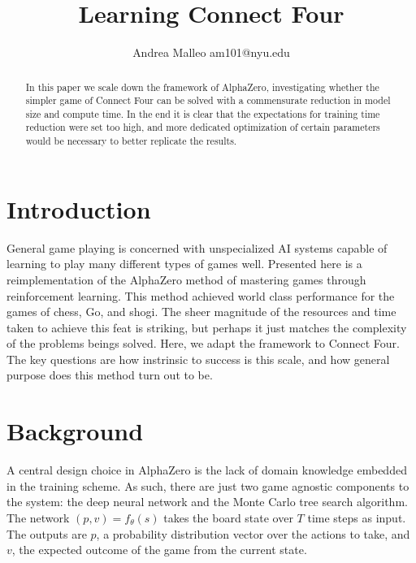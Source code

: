 \documentclass[twoside,11pt]{article}
\begin{document}
\title{Learning Connect Four}

\author{\name Andrea Malleo \email am101@nyu.edu \\}

\maketitle

\begin{abstract}%
In this paper we scale down the framework of AlphaZero,
investigating whether the simpler game of Connect Four can be solved with a commensurate
reduction in model size and compute time. In the end it is clear that the expectations 
for training time reduction were set too high, and more dedicated optimization of certain parameters
would be necessary to better replicate the results. 
\end{abstract}

  
 
\section{Introduction}
General game playing %
 is concerned with unspecialized AI systems
capable of learning to play many different types of games well. Presented here is a reimplementation of the AlphaZero \cite{AlphaZero}method of 
mastering games through reinforcement learning. This method achieved world class performance for 
the games of chess, Go, and shogi.  The sheer magnitude of the resources and time taken to achieve this feat 
is striking, 
but perhaps it just matches the complexity of the problems beings solved. Here, we adapt the framework to Connect Four.
The key questions are how instrinsic to success is this scale, and how general purpose does this method turn out to be.


\section{Background}
A central design choice in AlphaZero 
 is the lack of domain knowledge embedded in the training 
scheme. As such, there are just two game agnostic components to the system: the deep neural network and the
Monte Carlo tree search algorithm. The network $(p,v) = f_{\theta}(s)$
takes the board state over $T$ time steps as input. The outputs are $p$, a probability distribution vector
over the actions to take, and  $v$, the expected outcome of the game from the current state.
\end{document}
